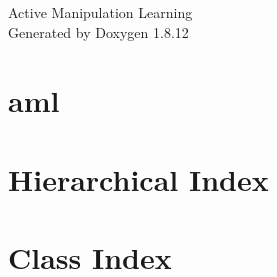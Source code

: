 \documentclass[twoside]{book}
\newcommand{\+}{\discretionary{\mbox{\scriptsize$\hookleftarrow$}}{}{}}
\newcommand{\clearemptydoublepage}{%
  \newpage{\pagestyle{empty}\cleardoublepage}%
}
\begin{document}
\hypersetup{pageanchor=false,
             bookmarksnumbered=true,
             pdfencoding=unicode
            }
\begin{titlepage}
\vspace*{7cm}
\begin{center}%
{\Large Active Manipulation Learning }\\
\vspace*{1cm}
{\large Generated by Doxygen 1.8.12}\\
\end{center}
\end{titlepage}
\clearemptydoublepage
{}
\tableofcontents
\clearemptydoublepage
{}
\hypersetup{pageanchor=true}

\chapter{aml}
\label{md__r_e_a_d_m_e}
\hypertarget{md__r_e_a_d_m_e}{}

\chapter{Hierarchical Index}

\chapter{Class Index}

\end{document}
